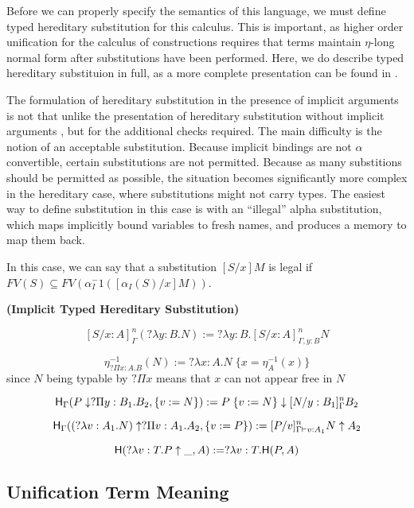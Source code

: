 Before we can properly specify the semantics of this language, 
we must define typed hereditary substitution for this calculus.  This is important, as higher order unification for the calculus of constructions 
requires that terms maintain $\eta$-long normal form after substitutions have been performed.
Here, we do describe typed hereditary substituion in full, as a more complete presentation can be found in \citep{keller2010normalization}.

The formulation of hereditary substitution in the presence of 
implicit arguments is not that unlike the presentation of
hereditary substitution without implicit arguments \citep{miller1991uniform}, 
but for the additional checks required.
The main difficulty is the notion of an acceptable substitution. 
Because implicit bindings are not $\alpha$ convertible, 
certain substitutions are not permitted.  
Because as many substitions should be permitted as possible, 
the situation becomes significantly more complex in the 
hereditary case, where substitutions might not carry types.  
The easiest way to define substitution in this case is with an ``illegal'' alpha substitution, 
which maps implicitly bound variables to fresh names, 
and produces a memory to map them back. 


In this case, we can say that a substitution $[S/x] M$ is legal if 
$FV(S) \subseteq FV(\alpha_I^-1( [\alpha_I(S)/x] M) )$.

\begin{definition}
\textbf{(Implicit Typed Hereditary Substitution)}

\[
[S / x : A]^n_{\Gamma } (?\lambda y : B . N) := ?\lambda y:B . [S / x : A]^n_{\Gamma, y : B} N
\] 

\[
\eta^{-1}_{?\Pi x : A . B}(N) := ?\lambda x : A . N \; \{ x = \eta^{-1}_A(x) \}
\] since $N$ being typable by $?\Pi x $ means that $x$ can not appear free in $N$

\[
\mathsf{H}_{\Gamma}(P \downarrow ?\Pi y : B_1 . B_2 , \{ v := N \} ) := P\; \{ v := N \} \downarrow [N/y : B_1]^n_{\Gamma}B_2
\]

\[
\mathsf{H}_{\Gamma} ((?\lambda v : A_1 . N) \uparrow ?\Pi v : A_1 . A_2 , \{ v := P \}) 
:= [P/v]^n_{\Gamma \vdash v : A_1} N \uparrow A_2
\]

\[ 
\mathsf{H}(?\lambda v : T . P \uparrow \_ , A) := ?\lambda v : T . \mathsf{H}(P,A)
\]

\label{def:hered}
\end{definition}


\subsection{Unification Term Meaning}

